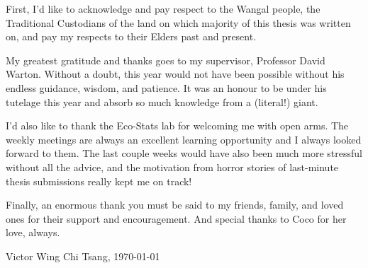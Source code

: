 
{\bigskip} First, I'd like to acknowledge and pay respect to the Wangal people, the Traditional Custodians of the land on which majority of this thesis was written on, and pay my respects to their Elders past and present.

{\bigskip} My greatest gratitude and thanks goes to my supervisor, Professor David Warton. Without a doubt, this year would not have been possible without his endless guidance, wisdom, and patience. It was an honour to be under his tutelage this year and absorb so much knowledge from a (literal!) giant.

{\bigskip} I'd also like to thank the Eco-Stats lab for welcoming me with open arms. The weekly meetings are always an excellent learning opportunity and I always looked forward to them. The last couple weeks would have also been much more stressful without all the advice, and the motivation from horror stories of last-minute thesis submissions really kept me on track!

{\bigskip} Finally, an enormous thank you must be said to my friends, family, and loved ones for their support and encouragement. And special thanks to Coco for her love, always.

{\bigskip\bigskip\bigskip}Victor Wing Chi Tsang, \today